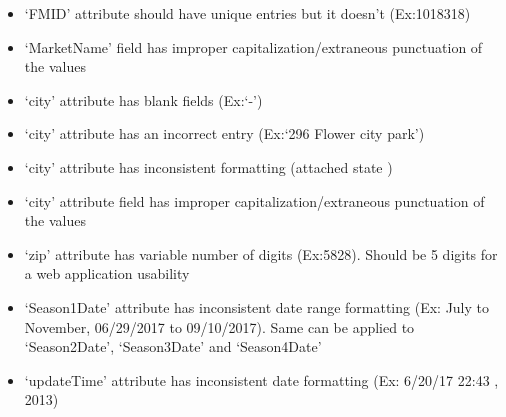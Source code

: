 \documentclass[10pt]{article}
\begin{document}
\begin{itemize}
  \item `FMID' attribute should have unique entries but it doesn't (Ex:1018318)
  \item `MarketName' field has improper capitalization/extraneous punctuation of the values 
  \item `city' attribute has blank fields (Ex:`-')
  \item `city' attribute has an incorrect entry (Ex:`296 Flower city park')
  \item `city' attribute has inconsistent formatting (attached state )
  \item `city' attribute field has improper capitalization/extraneous punctuation of the values
  \item `zip' attribute has variable number of digits (Ex:5828). Should be 5 digits \cite{zip} for a web application usability
  \item `Season1Date' attribute has inconsistent date range formatting (Ex: July to November, 06/29/2017 to 09/10/2017). Same can be applied to `Season2Date', `Season3Date' and `Season4Date' 
  \item `updateTime' attribute has inconsistent date formatting (Ex: 6/20/17 22:43 , 2013)
\end{itemize} 
\end{document}
